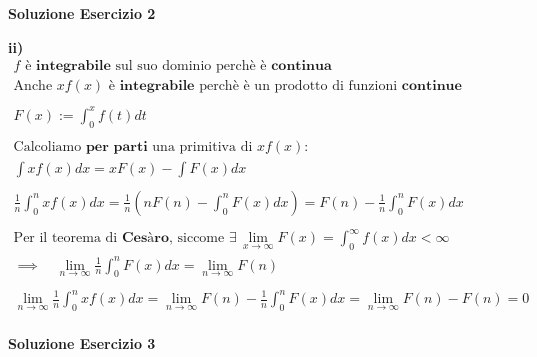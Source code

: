 \documentclass[11pt,reqno]{amsart}
\begin{document}
\newpage

\centerline{\bf Soluzione Esercizio 2 }

{\bf ii)}
\begin{gather*}
  f \text{ è } \textbf{integrabile} \text{ sul suo dominio perchè è } \textbf{continua}\\
  \text{Anche } xf(x) \text{ è } \textbf{integrabile} \text{ perchè è un prodotto di funzioni } \textbf{continue}\\\\
  F(x) := \int_{0}^{x} f(t) dt\\\\
  \text{Calcoliamo } \textbf{per parti} \text{ una primitiva di } xf(x):\\
  \int xf(x) dx = xF(x) - \int F(x) dx\\\\
  \frac{1}{n} \int_{0}^{n} xf(x) dx = \frac{1}{n}\left(nF(n) - \int_{0}^{n} F(x) dx\right) = F(n) - \frac{1}{n} \int_{0}^{n} F(x) dx\\\\
  \text{Per il teorema di } \textbf{Cesàro} \text{, siccome } \exists \, \lim_{x \to \infty} F(x) = \int_{0}^{\infty} f(x)dx < \infty\\
  \implies \quad \lim_{n \to \infty} \frac{1}{n} \int_{0}^{n} F(x) dx = \lim_{n \to \infty} F(n)\\\\
  \lim_{n \to \infty} \frac{1}{n} \int_{0}^{n} xf(x) dx = \lim_{n \to \infty} F(n) - \frac{1}{n} \int_{0}^{n} F(x) dx = \lim_{n \to \infty} F(n) - F(n) = 0\\
\end{gather*}

\newpage

\centerline{\bf Soluzione Esercizio 3 }

\bigskip
\end{document}
